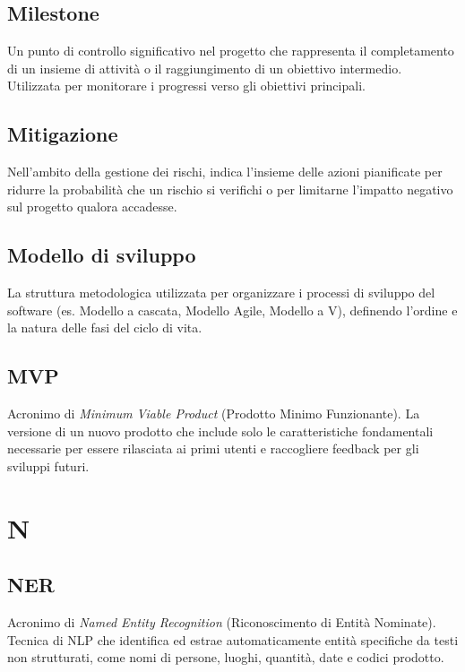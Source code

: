 \documentclass[a4paper, 11pt, oneside]{scrartcl} %
\begin{document}
\subsection*{Milestone}
Un punto di controllo significativo nel progetto che rappresenta il completamento di un insieme di attività o il raggiungimento di un obiettivo intermedio. Utilizzata per monitorare i progressi verso gli obiettivi principali.
\vspace{0.5cm}

\subsection*{Mitigazione}
Nell'ambito della gestione dei rischi, indica l'insieme delle azioni pianificate per ridurre la probabilità che un rischio si verifichi o per limitarne l'impatto negativo sul progetto qualora accadesse.
\vspace{0.5cm}

\subsection*{Modello di sviluppo}
La struttura metodologica utilizzata per organizzare i processi di sviluppo del software (es. Modello a cascata, Modello Agile, Modello a V), definendo l'ordine e la natura delle fasi del ciclo di vita.
\vspace{0.5cm}

\subsection*{MVP}
Acronimo di \textit{Minimum Viable Product} (Prodotto Minimo Funzionante). La versione di un nuovo prodotto che include solo le caratteristiche fondamentali necessarie per essere rilasciata ai primi utenti e raccogliere feedback per gli sviluppi futuri.
\vspace{0.5cm}


\section*{N}


\subsection*{NER}
Acronimo di \textit{Named Entity Recognition} (Riconoscimento di Entità Nominate). Tecnica di NLP che identifica ed estrae automaticamente entità specifiche da testi non strutturati, come nomi di persone, luoghi, quantità, date e codici prodotto.
\vspace{0.5cm}
\end{document}
